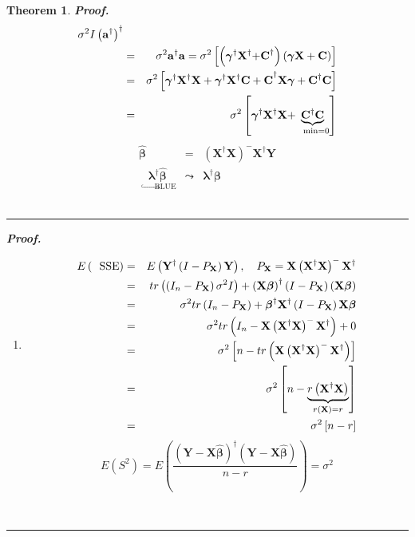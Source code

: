 \documentclass{article}
\newtheorem{theorem}{Theorem}
\newenvironment{proof}[1][Proof]{\noindent\textbf{#1.} }{\ \rule{0.5em}{0.5em}}
\begin{document}
\begin{theorem}
\begin{proof}
\begin{eqnarray*}
{}\sigma ^{2}I\left( \mathbf{a}^{\dagger }\right) ^{\dagger } \\
&=&\sigma ^{2}\mathbf{a}^{\dagger }\mathbf{a}=\sigma ^{2}\left[ \left( 
\mathbf{\gamma }^{\dagger }\mathbf{X}^{\dagger }\mathbf{+C}^{\dagger
}\right) \left( \mathbf{\gamma X+C}\right) \right] \\
&=&\sigma ^{2}\left[ \mathbf{\gamma }^{\dagger }\mathbf{X}^{\dagger }\mathbf{%
X+\mathbf{\gamma }^{\dagger }\mathbf{X}^{\dagger }C+C}^{\dagger }\mathbf{%
X\gamma +C}^{\dagger }\mathbf{C}\right] \\
&=&\sigma ^{2}\left[ \mathbf{\gamma }^{\dagger }\mathbf{X}^{\dagger }\mathbf{%
X+}\underset{\text{min=0}}{\underbrace{\mathbf{C}^{\dagger }\mathbf{C}}}%
\right]
\end{eqnarray*}%
\begin{eqnarray*}
\mathbf{\hat{\beta}} &=&\left( \mathbf{X}^{\dagger }\mathbf{X}\right) ^{-}%
\mathbf{X}^{\dagger }\mathbf{Y} \\
\underset{\quad \hookrightarrow \text{BLUE}}{\mathbf{\lambda }^{\dagger }%
\mathbf{\hat{\beta}}} &\mathbf{\leadsto }&\mathbf{\lambda }^{\dagger }%
\mathbf{\beta }
\end{eqnarray*}
\end{proof}

\begin{proof}

\begin{enumerate}
\item 
\begin{eqnarray*}
E\left( \text{SSE}\right) &=&E\left( \mathbf{Y}^{\dagger }\left( I-P_{%
\mathbf{X}}\right) \mathbf{Y}\right) ,\quad P_{\mathbf{X}}=\mathbf{X}\left( 
\mathbf{X}^{\dagger }\mathbf{X}\right) ^{-}\mathbf{X}^{\dagger } \\
&=&tr\left( \left( I_{n}-P_{\mathbf{X}}\right) \sigma ^{2}I\right) +\left( 
\mathbf{X\beta }\right) ^{\dagger }\left( I-P_{\mathbf{X}}\right) \left( 
\mathbf{X\beta }\right) \\
&=&\sigma ^{2}tr\left( I_{n}-P_{\mathbf{X}}\right) +\mathbf{\beta }^{\dagger
}\mathbf{X}^{\dagger }\left( I-P_{\mathbf{X}}\right) \mathbf{X\beta } \\
&=&\sigma ^{2}tr\left( I_{n}-\mathbf{X}\left( \mathbf{X}^{\dagger }\mathbf{X}%
\right) ^{-}\mathbf{X}^{\dagger }\right) +0 \\
&=&\sigma ^{2}\left[ n-tr\left( \mathbf{X}\left( \mathbf{X}^{\dagger }%
\mathbf{X}\right) ^{-}\mathbf{X}^{\dagger }\right) \right] \\
&=&\sigma ^{2}\left[ n-\underset{r\left( \mathbf{X}\right) =r}{\underbrace{%
r\left( \mathbf{X}^{\dagger }\mathbf{X}\right) }}\right] \\
&=&\sigma ^{2}\left[ n-r\right]
\end{eqnarray*}%
\begin{equation*}
E\left( S^{2}\right) =E\left( \frac{\left( \mathbf{Y}-\mathbf{X\hat{\beta}}%
\right) ^{\dagger }\left( \mathbf{Y}-\mathbf{X\hat{\beta}}\right) }{n-r}%
\right) =\sigma ^{2}
\end{equation*}


\end{enumerate}
\end{proof}
\end{theorem}
\end{document}
